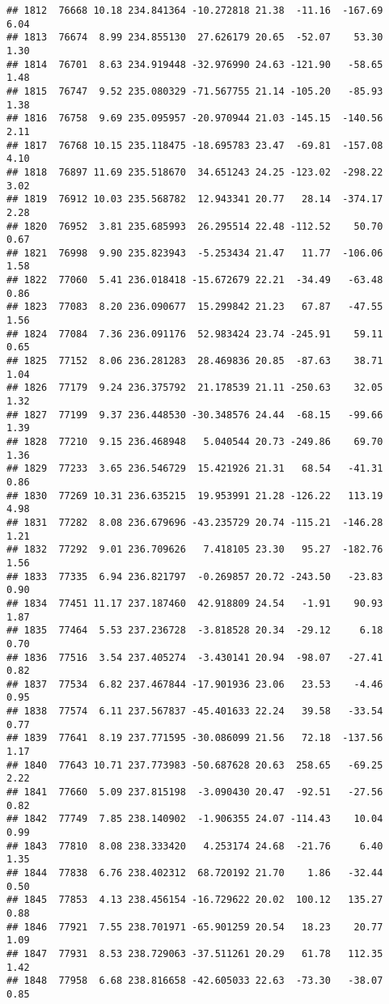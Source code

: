 \documentclass[]{article}
\begin{document}
\begin{verbatim}
## 1812  76668 10.18 234.841364 -10.272818 21.38  -11.16  -167.69  6.04
## 1813  76674  8.99 234.855130  27.626179 20.65  -52.07    53.30  1.30
## 1814  76701  8.63 234.919448 -32.976990 24.63 -121.90   -58.65  1.48
## 1815  76747  9.52 235.080329 -71.567755 21.14 -105.20   -85.93  1.38
## 1816  76758  9.69 235.095957 -20.970944 21.03 -145.15  -140.56  2.11
## 1817  76768 10.15 235.118475 -18.695783 23.47  -69.81  -157.08  4.10
## 1818  76897 11.69 235.518670  34.651243 24.25 -123.02  -298.22  3.02
## 1819  76912 10.03 235.568782  12.943341 20.77   28.14  -374.17  2.28
## 1820  76952  3.81 235.685993  26.295514 22.48 -112.52    50.70  0.67
## 1821  76998  9.90 235.823943  -5.253434 21.47   11.77  -106.06  1.58
## 1822  77060  5.41 236.018418 -15.672679 22.21  -34.49   -63.48  0.86
## 1823  77083  8.20 236.090677  15.299842 21.23   67.87   -47.55  1.56
## 1824  77084  7.36 236.091176  52.983424 23.74 -245.91    59.11  0.65
## 1825  77152  8.06 236.281283  28.469836 20.85  -87.63    38.71  1.04
## 1826  77179  9.24 236.375792  21.178539 21.11 -250.63    32.05  1.32
## 1827  77199  9.37 236.448530 -30.348576 24.44  -68.15   -99.66  1.39
## 1828  77210  9.15 236.468948   5.040544 20.73 -249.86    69.70  1.36
## 1829  77233  3.65 236.546729  15.421926 21.31   68.54   -41.31  0.86
## 1830  77269 10.31 236.635215  19.953991 21.28 -126.22   113.19  4.98
## 1831  77282  8.08 236.679696 -43.235729 20.74 -115.21  -146.28  1.21
## 1832  77292  9.01 236.709626   7.418105 23.30   95.27  -182.76  1.56
## 1833  77335  6.94 236.821797  -0.269857 20.72 -243.50   -23.83  0.90
## 1834  77451 11.17 237.187460  42.918809 24.54   -1.91    90.93  1.87
## 1835  77464  5.53 237.236728  -3.818528 20.34  -29.12     6.18  0.70
## 1836  77516  3.54 237.405274  -3.430141 20.94  -98.07   -27.41  0.82
## 1837  77534  6.82 237.467844 -17.901936 23.06   23.53    -4.46  0.95
## 1838  77574  6.11 237.567837 -45.401633 22.24   39.58   -33.54  0.77
## 1839  77641  8.19 237.771595 -30.086099 21.56   72.18  -137.56  1.17
## 1840  77643 10.71 237.773983 -50.687628 20.63  258.65   -69.25  2.22
## 1841  77660  5.09 237.815198  -3.090430 20.47  -92.51   -27.56  0.82
## 1842  77749  7.85 238.140902  -1.906355 24.07 -114.43    10.04  0.99
## 1843  77810  8.08 238.333420   4.253174 24.68  -21.76     6.40  1.35
## 1844  77838  6.76 238.402312  68.720192 21.70    1.86   -32.44  0.50
## 1845  77853  4.13 238.456154 -16.729622 20.02  100.12   135.27  0.88
## 1846  77921  7.55 238.701971 -65.901259 20.54   18.23    20.77  1.09
## 1847  77931  8.53 238.729063 -37.511261 20.29   61.78   112.35  1.42
## 1848  77958  6.68 238.816658 -42.605033 22.63  -73.30   -38.07  0.85

\end{verbatim}
\end{document}
